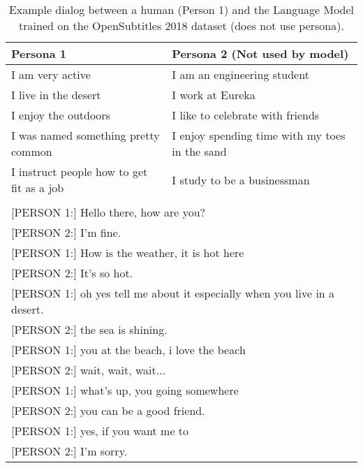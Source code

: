 \begin{table*}[t]
  \begin{center}
    \begin{small}
      \begin{tabular}{l|l}
        \toprule
        \textbf{Persona 1} & \textbf{Persona 2 (Not used by model)}\\
     \midrule   
I am very active & I am an engineering student \\ 
I live in the desert & I work at Eureka \\
I enjoy the outdoors & I like to celebrate with friends  \\
I was named something pretty common & I enjoy spending time with my toes in the sand\\
I instruct people how to get fit as a job &  I study to be a businessman \\
\bottomrule
\multicolumn{2}{l}{ }\\
\multicolumn{2}{l}{[PERSON 1:] Hello there, how are you?}\\
\multicolumn{2}{l}{[PERSON 2:] I'm fine.}\\
\multicolumn{2}{l}{[PERSON 1:] How is the weather, it is hot here }\\
\multicolumn{2}{l}{[PERSON 2:] It's so hot.}\\
\multicolumn{2}{l}{[PERSON 1:] oh yes tell me about it especially when you live in a desert.}\\
\multicolumn{2}{l}{[PERSON 2:] the sea is shining.}\\
\multicolumn{2}{l}{[PERSON 1:] you at the beach, i love the beach}\\
\multicolumn{2}{l}{[PERSON 2:] wait, wait, wait...}\\
\multicolumn{2}{l}{[PERSON 1:] what's up, you going somewhere }\\
\multicolumn{2}{l}{[PERSON 2:] you can be a good friend.}\\
\multicolumn{2}{l}{[PERSON 1:] yes, if you want me to}\\
\multicolumn{2}{l}{[PERSON 2:] I'm sorry.}\\
      \end{tabular}
      \caption{Example dialog between a human (Person 1) and the Language Model trained on the OpenSubtitles 2018 dataset (does not use persona). %
 \label{table:opensubtitles2018-example}}
    \end{small}
  \end{center}
\end{table*}


